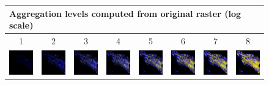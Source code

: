 \documentclass{itatnew}
\begin{document}
\begin{figure}[htp]
  \centering
  \begin{tabular}{cccccccc}
    \multicolumn{8}{l}{
      Aggregation levels computed from original raster (log scale)
    }\\
    \hline
    1 & 2 & 3 & 4 & 5 & 6 & 7 & 8 \\
    \includegraphics[width=4.6em]{images/gen-rawdata-1}&
    \includegraphics[width=4.6em]{images/gen-rawdata-2}&
    \includegraphics[width=4.6em]{images/gen-rawdata-3}&
    \includegraphics[width=4.6em]{images/gen-rawdata-4}&
    \includegraphics[width=4.6em]{images/gen-rawdata-5}&
    \includegraphics[width=4.6em]{images/gen-rawdata-6}&
    \includegraphics[width=4.6em]{images/gen-rawdata-7}&
    \includegraphics[width=4.6em]{images/gen-rawdata-8}

\end{tabular}
\end{figure}
\end{document}
